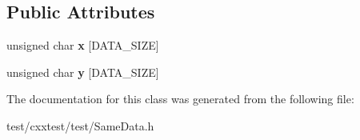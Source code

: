 \subsection*{Public Attributes}
\begin{DoxyCompactItemize}
\item 
\hypertarget{classSameData_ad22e080ecb5290e5ebfab357e2d7200a}{unsigned char {\bfseries x} \mbox{[}D\-A\-T\-A\-\_\-\-S\-I\-Z\-E\mbox{]}}\label{classSameData_ad22e080ecb5290e5ebfab357e2d7200a}

\item 
\hypertarget{classSameData_aea0c7b3837f7b246dd8198a372bfca45}{unsigned char {\bfseries y} \mbox{[}D\-A\-T\-A\-\_\-\-S\-I\-Z\-E\mbox{]}}\label{classSameData_aea0c7b3837f7b246dd8198a372bfca45}

\end{DoxyCompactItemize}


The documentation for this class was generated from the following file\-:\begin{DoxyCompactItemize}
\item 
test/cxxtest/test/Same\-Data.\-h\end{DoxyCompactItemize}
